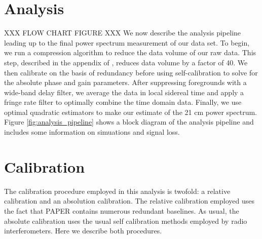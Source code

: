 \documentclass[twocolumn,numberedappendix]{emulateapj} \shorttitle{PSA64}
\begin{document}
\section{Analysis}\label{sec:analysis}
XXX FLOW CHART FIGURE XXX
We now describe the analysis pipeline leading up to the final power spectrum
measurement of our data set. To begin, we run a compression algorithm to reduce
the data volume of our raw data. This step, described in the appendix of
\cite{parsons_et_al2014a}, reduces data volume by a factor of 40. We then
calibrate on the basis of redundancy before using self-calibration
to solve for the absolute phase and gain parameters. After suppressing
foregrounds with a wide-band delay filter, we average the data in local
sidereal time and apply a fringe rate filter to optimally combine the
time domain data. Finally, we use optimal quadratic estimators to make our
estimate of the 21 cm power spectrum.  Figure \ref{fig:analysis_pipeline} shows
a block diagram of the analysis pipeline and includes some information on
simuations and signal loss.

\section{Calibration}\label{sec:calibration}
The calibration procedure employed in this analysis is twofold: a relative
calibration and an absolution calibration. The relative calibration employed
uses the fact that PAPER contains numerous redundant baselines. As usual, the
absolute calibration uses the usual self calibration methods employed by radio
interferometers. Here we describe both procedures.
\end{document}

